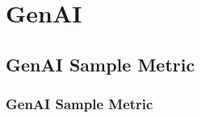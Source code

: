 \chapter{GenAI}


\clearpage
\thispagestyle{clusteringstyle}
\section{GenAI Sample Metric}
\subsection{GenAI Sample Metric}